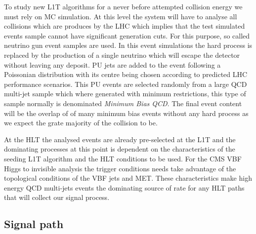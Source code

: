 To study new \gls{L1T} algorithms for a never before attempted collision energy we must rely on \gls{MC} simulation. At this level the system will have to analyse all collisions which are produces by the \gls{LHC} which implies that the test simulated events sample cannot have significant generation cuts. For this purpose, so called neutrino gun event samples are used. In this event simulations the hard process is replaced by the production of a single neutrino which will escape the detector without leaving any deposit. \acrfull{PU} jets are added to the event following a Poissonian distribution with its centre being chosen according to predicted \gls{LHC} performance scenarios. This \gls{PU} events are selected randomly from a large \gls{QCD} multi-jet sample which where generated with minimum restrictions, this type of sample normally is denominated \textit{Minimum Bias QCD}. The final event content will be the overlap of of many minimum bias events without any hard process as we expect the grate majority of the collision to be.

At the \gls{HLT} the analysed events are already pre-selected at the \gls{L1T} and the dominating processes at this point is dependent on the characteristics of the seeding \gls{L1T} algorithm and the \gls{HLT} conditions to be used. For the \gls{CMS} \gls{VBF} Higgs to invisible analysis the trigger conditions needs take advantage of the topological conditions of the \gls{VBF} jets and \gls{MET}. These characteristics make high energy \gls{QCD} multi-jets events the dominating source of rate for any \gls{HLT} paths that will collect our signal process.




\subsection{Signal path}

